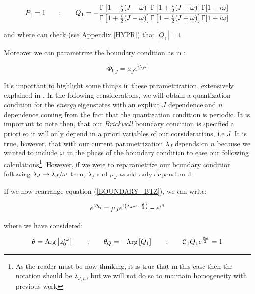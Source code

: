 \documentclass[11pt,a4paper]{article}
\begin{document}
\begin{equation}
    P_1 = 1 ~~~~~~ ; ~~~~~~ Q_1 = - \frac{\Gamma\left[1-\frac{i}{2}(J-\omega)\right]\Gamma\left[1+\frac{i}{2}(J+\omega)\right]\Gamma[1-i\omega]}{\Gamma\left[1+\frac{i}{2}(J-\omega)\right]\Gamma\left[1-\frac{i}{2}(J+\omega)\right]\Gamma[1+i\omega]}
\end{equation}

{\noindent and where can check (see Appendix \ref{HYPR}) that $\left|Q_1\right|=1$

Moreover we can parametrize the boundary condition as in \cite{Jeong_2025,Das_2023,das2023fuzzballsrandommatrices}:

\begin{equation}
    {\Phi_0}_J = \mu_J e^{i\lambda_J\omega}
\end{equation}

It's important to highlight some things in these parametrization, extensively explained in \cite{das2023fuzzballsrandommatrices}. In the following considerations, we will obtain a quantization condition for the \textit{energy} eigenstates with an explicit $J$ dependence and $n$ dependence coming from the fact that the quantization condition is periodic. It is important to note then, that our \textit{Brickwall} boundary condition is specified a priori so it will only depend in a priori variables of our considerations, i.e $J$. It is true, however, that with our current parametrization $\lambda_J$ depends on $n$ because we wanted to include $\omega$ in the phase of the boundary condition to ease our following calculations\footnote{As the reader must be now thinking, it is true that in this case then the notation should be $\lambda_{J,n}$, but we will not do so to maintain homogeneity with previous work}. However, if we were to reparametrize our boundary condition following $\lambda_J \rightarrow \lambda_J/\omega$ then, $\lambda_j$ and $\mu_J$ would only depend on J.

If we now rearrange equation (\ref{BOUNDARY_BTZ}), we can write:

\begin{equation}\LA{QUANTIZATION_BTZ}
    e^{i\theta_Q} = \mu_J e^{i\left(\lambda_J\w + \frac{\theta}{2}\right)} - e^{i\theta}
\end{equation}

{\noindent where we have considered:}

\begin{equation}
    \theta = \text{Arg}\left[z_0^{i\omega}\right] ~~~~~~;~~~~~~\theta_Q = -\text{Arg}\left[Q_1\right] ~~~~~~;~~~~~~ \mbox{${\cal C}$}_1Q_1e^{\frac{\pi\omega}{2}}=1
\end{equation}

}
\end{document}
